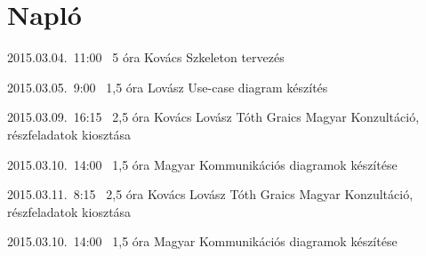 %
\pagebreak
\section{Napló}

\begin{naplo}

\bejegyzes
{2015.03.04.~11:00~}
{5 óra}
{Kovács}
{Szkeleton tervezés}

\bejegyzes
{2015.03.05.~9:00~}
{1,5 óra}
{Lovász}
{Use-case diagram készítés}

\bejegyzes
{2015.03.09.~16:15~} %
{2,5 óra} %
{Kovács\newline
Lovász\newline
Tóth\newline
Graics\newline
Magyar
} %
{Konzultáció, részfeladatok kiosztása}

\bejegyzes
{2015.03.10.~14:00~}
{1,5 óra}
{Magyar}
{Kommunikációs diagramok készítése}

\bejegyzes
{2015.03.11.~8:15~} %
{2,5 óra} %
{Kovács\newline
Lovász\newline
Tóth\newline
Graics\newline
Magyar
} %
{Konzultáció, részfeladatok kiosztása}

\bejegyzes
{2015.03.10.~14:00~}
{1,5 óra}
{Magyar}
{Kommunikációs diagramok készítése}

\end{naplo}

